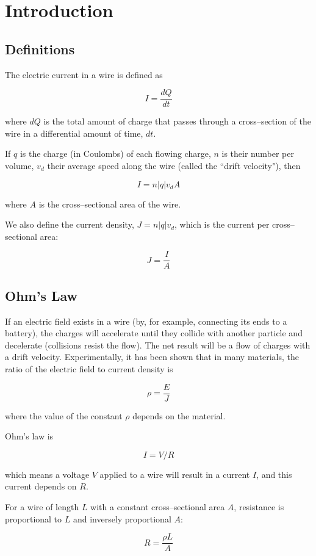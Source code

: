 \documentclass{article}
\begin{document}
\section{Introduction}

\subsection{Definitions}

The electric current in a wire is defined as 

$$I = \frac{dQ}{dt}$$

where $dQ$ is the total amount of charge that passes through a cross--section of the wire in a differential amount of time, $dt$.

If $q$ is the charge (in Coulombs) of each flowing charge, $n$ is their number per volume, $v_d$ their average speed along the wire (called the ``drift velocity"), then

$$I = n|q|v_dA$$

where $A$ is the cross--sectional area of the wire.

We also define the current density, $J = n|q|v_d$, which is the current per cross--sectional area:

$$J=\frac{I}{A}$$

\subsection{Ohm's Law}

If an electric field exists in a wire (by, for example, connecting its ends to a battery), the charges will accelerate until they collide with another particle and decelerate (collisions resist the flow). The net result will be a flow of charges with a drift velocity. Experimentally, it has been shown that in many materials, the ratio of the electric field to current density is 

$$\rho = \frac{E}{J}$$

where the value of the constant $\rho$ depends on the material.

Ohm's law is

$$I = V/R$$

which means a voltage $V$ applied to a wire will result in a current $I$, and this current depends on $R$.

For a wire of length $L$ with a constant cross--sectional area $A$, resistance is proportional to $L$ and inversely proportional $A$:

$$R = \frac{\rho L}{A}$$
\end{document}
